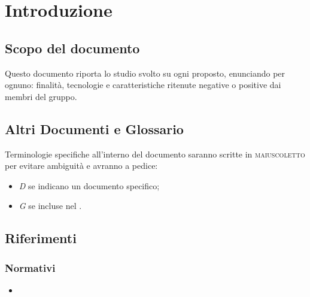 \documentclass[]{article}
\begin{document}
	

	\newpage


	\tableofcontents
    \newpage

	\section{Introduzione}
		\subsection{Scopo del documento}
		Questo documento riporta lo studio svolto su ogni  proposto,
		enunciando per ognuno: finalità, tecnologie e caratteristiche ritenute
		negative o positive dai membri del gruppo.

		\subsection{Altri Documenti e Glossario}
		Terminologie specifiche all'interno del documento saranno scritte in \textsc{maiuscoletto} per evitare ambiguità e avranno a pedice:
		\begin{itemize}
			\item \textit{D} se indicano un documento specifico;
			\item \textit{G} se incluse nel .
		\end{itemize}

		\subsection{Riferimenti}
			\subsubsection{Normativi}
			\begin{itemize}
				\item \textbf{}
			\end{itemize}
\end{document}
